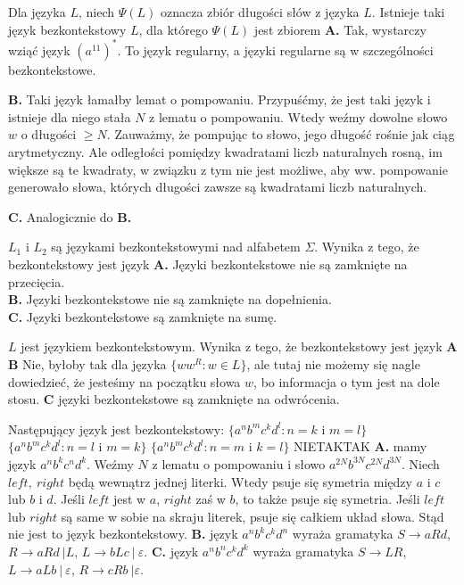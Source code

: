 \begin{solutions}
    \sol Dla języka $L$, niech $\Psi(L)$ oznacza zbiór długości słów z języka $L$. Istnieje taki język bezkontekstowy $L$, dla którego $\Psi(L)$ jest zbiorem
    \textbf{A.} Tak, wystarczy wziąć język $(a^{11})^*$. To język regularny, a języki regularne są w szczególności bezkontekstowe.

    \textbf{B.} Taki język łamałby lemat o pompowaniu. Przypuśćmy, że jest taki język i istnieje dla niego stała $N$ z lematu o pompowaniu. Wtedy weźmy dowolne słowo $w$ o długości $\geq N$. Zauważmy, że pompując to słowo, jego długość rośnie jak ciąg arytmetyczny. Ale odległości pomiędzy kwadratami liczb naturalnych rosną, im większe są te kwadraty, w związku z tym nie jest możliwe, aby ww. pompowanie generowało słowa, których długości zawsze są kwadratami liczb naturalnych.

    \textbf{C.} Analogicznie do \textbf{B.}


    \sol $L_1$ i $L_2$ są językami bezkontekstowymi nad alfabetem $\Sigma$. Wynika z tego, że bezkontekstowy jest język
    \textbf{A.} Języki bezkontekstowe nie są zamknięte na przecięcia. \\
    \textbf{B.} Języki bezkontekstowe nie są zamknięte na dopełnienia. \\
    \textbf{C.} Języki bezkontekstowe są zamknięte na sumę.
    
    \sol $L$ jest językiem bezkontekstowym. Wynika z tego, że bezkontekstowy jest język
    \textbf{A}  \textbf{B} Nie, byłoby tak dla języka $\{ww^R : w \in L \}$, ale tutaj nie możemy się nagle dowiedzieć, że jesteśmy na początku słowa $w$, bo informacja o tym jest na dole stosu. \textbf{C} języki bezkontekstowe są zamknięte na odwrócenia.
    
    \sol Następujący język jest bezkontekstowy:
    \answerss
    {$\{a^nb^mc^kd^l : n = k \text{ i } m = l\}$}
    {$\{a^nb^mc^kd^l : n = l \text{ i } m = k\}$}
    {$\{a^nb^mc^kd^l :n=m \text{ i } k=l\}$}
    {NIE}{TAK}{TAK}    
    \textbf{A.} mamy język $a^nb^kc^nd^k$. Weźmy $N$ z lematu o pompowaniu i słowo $a^{2N}b^{3N}c^{2N}d^{3N}$. Niech $left, \ right$ będą wewnątrz jednej literki. Wtedy psuje się symetria między $a$ i $c$ lub $b$ i $d$. Jeśli $left$ jest w $a$, $right$ zaś w $b$, to także psuje się symetria. Jeśli $left$ lub $right$ są same w sobie na skraju literek, psuje się całkiem układ słowa. Stąd nie jest to język bezkontekstowy. 
    \textbf{B.} język $a^nb^kc^kd^n$ wyraża gramatyka $S \to aRd$, $R\to aRd \ | L$, $L \to bLc \ | \ \varepsilon$.
    \textbf{C.} język $a^nb^nc^kd^k$ wyraża gramatyka $S \to LR$, $L \to aLb \ | \ \varepsilon$, $R \to cRb \ | \varepsilon$.


\end{solutions}
